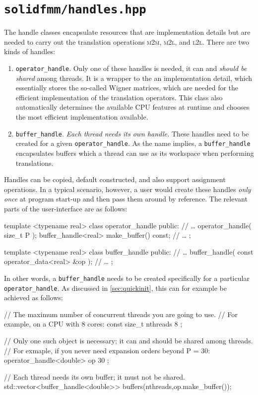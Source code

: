 \documentclass{scrbook}
\newcommand{\MtoM}{\textsc{m2m}}
\newcommand{\MtoL}{\textsc{m2l}}
\newcommand{\LtoL}{\textsc{l2l}}
\begin{document}
\section{\texttt{solidfmm/handles.hpp}}\label{sec:handles}
The handle classes encapsulate resources that are implementation details but
are needed to carry out the translation operations \MtoM, \MtoL, and \LtoL.
There are two kinds of handles:
\begin{enumerate}
\item \lstinline|operator_handle|. Only one of these handles is needed, it
can and \emph{should be shared} among threads. It is a wrapper to the an
implementation detail, which essentially stores the so-called Wigner matrices,
which are needed for the efficient implementation of the translation operators.
This class also automatically determines the available CPU features at runtime
and chooses the most efficient implementation available.
\item \lstinline|buffer_handle|. \emph{Each thread needs its own handle.} These
handles need to be created for a given \lstinline|operator_handle|. As the
name implies, a \lstinline|buffer_handle| encapsulates buffers which a thread
can use as its workspace when performing translations.
\end{enumerate}

Handles can be copied, default constructed, and also support assignment
operations. In a typical scenario, however, a user would create these handles
\emph{only once} at program start-up and then pass them around by reference.
The relevant parts of the user-interface are as follows:
\begin{cppcode*}
template <typename real>
class operator_handle
{
public:
	// …
    operator_handle( size_t P );
    buffer_handle<real> make_buffer() const;    
	// …
};

template <typename real>
class buffer_handle
{
public:
	// …
    buffer_handle( const operator_data<real> &op );
	// …
};
\end{cppcode*}

In other words, a \lstinline|buffer_handle| needs to be created specifically
for a particular \lstinline|operator_handle|. As discussed in
\cref{sec:quickinit}, this can for example be achieved as follows:
\begin{cppcode*}
// The maximum number of concurrent threads you are going to use.
// For example, on a CPU with 8 cores:
const size_t nthreads { 8 };

// Only one such object is necessary; it can and should be shared among threads.
// For exmaple, if you never need expansion orders beyond P = 30:
operator_handle<double> op  { 30 }; 
                                     
// Each thread needs its own buffer; it must not be shared.
std::vector<buffer_handle<double>> buffers(nthreads,op.make_buffer());
\end{cppcode*}
\end{document}
